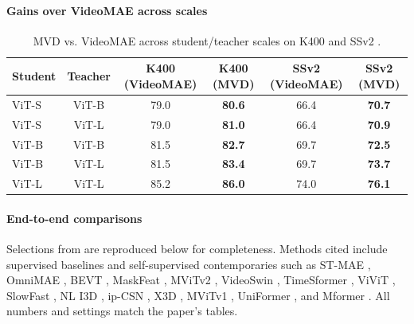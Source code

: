 \begin{enrichment}
\begin{enrichment}
            \paragraph{Gains over VideoMAE across scales}
            \label{par:chapter24_mvd_vs_videomae_gains}
            \begin{table}[H]
                \centering
                \small
                \setlength{\tabcolsep}{6pt}
                \caption{MVD vs. VideoMAE across student/teacher scales on K400 and SSv2 \cite{wang2023_mvd,tong2022_videomae}.}
                \label{tab:chapter24_mvd_vs_videomae_scales}
                \begin{tabular}{lccccc}
                    \toprule
                    \textbf{Student} & \textbf{Teacher} & \textbf{K400 (VideoMAE)} & \textbf{K400 (MVD)} & \textbf{SSv2 (VideoMAE)} & \textbf{SSv2 (MVD)} \\
                    \midrule
                    ViT-S & ViT-B & 79.0 & \textbf{80.6} & 66.4 & \textbf{70.7} \\
                    ViT-S & ViT-L & 79.0 & \textbf{81.0} & 66.4 & \textbf{70.9} \\
                    ViT-B & ViT-B & 81.5 & \textbf{82.7} & 69.7 & \textbf{72.5} \\
                    ViT-B & ViT-L & 81.5 & \textbf{83.4} & 69.7 & \textbf{73.7} \\
                    ViT-L & ViT-L & 85.2 & \textbf{86.0} & 74.0 & \textbf{76.1} \\
                    \bottomrule
                \end{tabular}
            \end{table}
            
            \paragraph{End-to-end comparisons}
            Selections from \cite{wang2023_mvd} are reproduced below for completeness. Methods cited include supervised baselines and self-supervised contemporaries such as ST-MAE \cite{feichtenhofer2022_mae_st}, OmniMAE \cite{girdhar2023_omnimae}, BEVT \cite{wang2022_bevt}, MaskFeat \cite{wei2022_maskfeat}, MViTv2 \cite{li2021_improved_mvit}, VideoSwin \cite{liu2022_videoswin}, TimeSformer \cite{bertasius2021_timesformer}, ViViT \cite{arnab2021_vivit}, SlowFast \cite{feichtenhofer2019_slowfast}, NL I3D \cite{wang2018_nonlocal}, ip-CSN \cite{tran2019_ipcsn}, X3D \cite{feichtenhofer2020_x3d}, MViTv1 \cite{fan2021_mvit}, UniFormer \cite{li2022_uniformer}, and Mformer \cite{patrick2021_mformer}. All numbers and settings match the paper’s tables.
            

\end{enrichment}
\end{enrichment}
